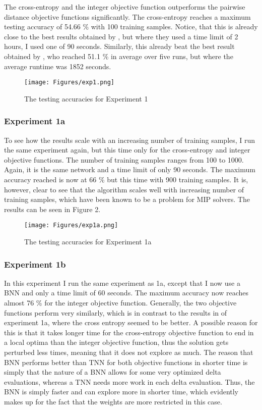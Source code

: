 The cross-entropy and the integer objective function outperforms the pairwise distance objective functions significantly. The cross-entropy reaches a maximum testing accuracy of 54.66 \% with 100 training samples. Notice, that this is already close to the best results obtained by \cite{icarte2019}, but where they used a time limit of 2 hours, I used one of 90 seconds. Similarly, this already beat the best result obtained by \cite{thorbjarnason2023}, who reached 51.1 \% in average over five runs, but where the average runtime was 1852 seconds. \\



\begin{figure}[H]
    \centering
    \texttt{[image: Figures/exp1.png]}
    \caption{The testing accuracies for Experiment 1}
    \label{Figure 1}
\end{figure}

\subsubsection{Experiment 1a}
To see how the results scale with an increasing number of training samples, I run the same experiment again, but this time only for the cross-entropy and integer objective functions. The number of training samples ranges from 100 to 1000. Again, it is the same network and a time limit of only 90 seconds. The maximum accuracy reached is now at 66 \% but this time with 900 training samples. It is, however, clear to see that the algorithm scales well with increasing number of training samples, which have been known to be a problem for MIP solvers. The results can be seen in Figure 2. 

\begin{figure}[H]
    \centering
    \texttt{[image: Figures/exp1a.png]}
    \caption{The testing accuracies for Experiment 1a}
    \label{Figure 2}
\end{figure}

\subsubsection{Experiment 1b}
In this experiment I run the same experiment as 1a, except that I now use a BNN and only a time limit of 60 seconds. The maximum accuracy now reaches almost 76 \% for the integer objective function. Generally, the two objective functions perform very similarly, which is in contrast to the results in of experiment 1a, where the cross entropy seemed to be better. A possible reason for this is that it takes longer time for the cross-entropy objective function to end in a local optima than the integer objective function, thus the solution gets perturbed less times, meaning that it does not explore as much. The reason that BNN performs better than TNN for both objective functions in shorter time is simply that the nature of a BNN allows for some very optimized delta evaluations, whereas a TNN needs more work in each delta evaluation. Thus, the BNN is simply faster and can explore more in shorter time, which evidently makes up for the fact that the weights are more restricted in this case. 


